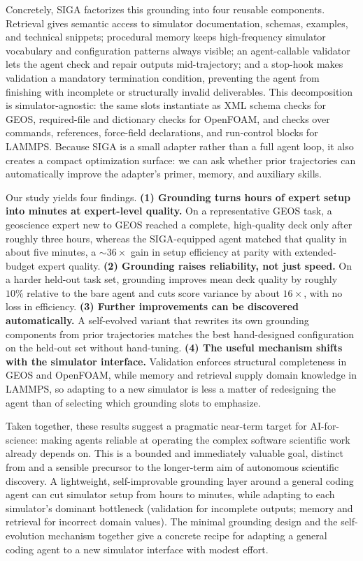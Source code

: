 \documentclass{article}
\begin{document}
Concretely, SIGA factorizes this grounding into four reusable components. Retrieval gives semantic access to simulator documentation, schemas, examples, and technical snippets; procedural memory keeps high-frequency simulator vocabulary and configuration patterns always visible; an agent-callable validator lets the agent check and repair outputs mid-trajectory; and a stop-hook makes validation a mandatory termination condition, preventing the agent from finishing with incomplete or structurally invalid deliverables. This decomposition is simulator-agnostic: the same slots instantiate as XML schema checks for GEOS, required-file and dictionary checks for OpenFOAM, and checks over commands, references, force-field declarations, and run-control blocks for LAMMPS. Because SIGA is a small adapter rather than a full agent loop, it also creates a compact optimization surface: we can ask whether prior trajectories can automatically improve the adapter’s primer, memory, and auxiliary skills.

Our study yields four findings. \textbf{(1) Grounding turns hours of expert setup into minutes at expert-level quality.} On a representative GEOS task, a geoscience expert new to GEOS reached a complete, high-quality deck only after roughly three hours, whereas the SIGA-equipped agent matched that quality in about five minutes, a ${\sim}36\times$ gain in setup efficiency at parity with extended-budget expert quality. \textbf{(2) Grounding raises reliability, not just speed.} On a harder held-out task set, grounding improves mean deck quality by roughly $10\%$ relative to the bare agent and cuts score variance by about $16\times$, with no loss in efficiency. \textbf{(3) Further improvements can be discovered automatically.} A self-evolved variant that rewrites its own grounding components from prior trajectories matches the best hand-designed configuration on the held-out set without hand-tuning. \textbf{(4) The useful mechanism shifts with the simulator interface.} Validation enforces structural completeness in GEOS and OpenFOAM, while memory and retrieval supply domain knowledge in LAMMPS, so adapting to a new simulator is less a matter of redesigning the agent than of selecting which grounding slots to emphasize.

Taken together, these results suggest a pragmatic near-term target for AI-for-science: making agents reliable at operating the complex software scientific work already depends on. This is a bounded and immediately valuable goal, distinct from and a sensible precursor to the longer-term aim of autonomous scientific discovery. A lightweight, self-improvable grounding layer around a general coding agent can cut simulator setup from hours to minutes, while adapting to each simulator's dominant bottleneck (validation for incomplete outputs; memory and retrieval for incorrect domain values). The minimal grounding design and the self-evolution mechanism together give a concrete recipe for adapting a general coding agent to a new simulator interface with modest effort.
\end{document}
